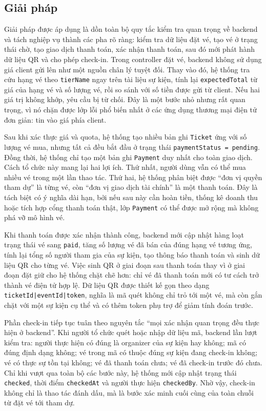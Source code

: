 \documentclass[../DoAn.tex]{subfiles}
\begin{document}
\subsection{Giải pháp}
Giải pháp được áp dụng là dồn toàn bộ quy tắc kiểm tra quan trọng về backend và tách nghiệp vụ thành các pha rõ ràng: kiểm tra dữ liệu đặt vé, tạo vé ở trạng thái chờ, tạo giao dịch thanh toán, xác nhận thanh toán, sau đó mới phát hành dữ liệu \gls{QR} và cho phép check-in. Trong controller đặt vé, backend không sử dụng giá client gửi lên như một nguồn chân lý tuyệt đối. Thay vào đó, hệ thống tra cứu hạng vé theo \texttt{tierName} ngay trên tài liệu sự kiện, tính lại \texttt{expectedTotal} từ giá của hạng vé và số lượng vé, rồi so sánh với số tiền được gửi từ client. Nếu hai giá trị không khớp, yêu cầu bị từ chối. Đây là một bước nhỏ nhưng rất quan trọng, vì nó chặn được lớp lỗi phổ biến nhất ở các ứng dụng thương mại điện tử đơn giản: tin vào giá phía client.

Sau khi xác thực giá và quota, hệ thống tạo nhiều bản ghi \texttt{Ticket} ứng với số lượng vé mua, nhưng tất cả đều bắt đầu ở trạng thái \texttt{paymentStatus = pending}. Đồng thời, hệ thống chỉ tạo một bản ghi \texttt{Payment} duy nhất cho toàn giao dịch. Cách tổ chức này mang lại hai lợi ích. Thứ nhất, người dùng vẫn có thể mua nhiều vé trong một lần thao tác. Thứ hai, hệ thống phân biệt được “đơn vị quyền tham dự” là từng vé, còn “đơn vị giao dịch tài chính” là một thanh toán. Đây là tách biệt có ý nghĩa dài hạn, bởi nếu sau này cần hoàn tiền, thống kê doanh thu hoặc tích hợp cổng thanh toán thật, lớp \texttt{Payment} có thể được mở rộng mà không phá vỡ mô hình vé.

Khi thanh toán được xác nhận thành công, backend mới cập nhật hàng loạt trạng thái vé sang \texttt{paid}, tăng số lượng vé đã bán của đúng hạng vé tương ứng, tính lại tổng số người tham gia của sự kiện, tạo thông báo thanh toán và sinh dữ liệu \gls{QR} cho từng vé. Việc sinh \gls{QR} ở giai đoạn sau thanh toán thay vì ở giai đoạn đặt giữ cho hệ thống chặt chẽ hơn: chỉ vé đã thanh toán mới có tư cách trở thành vé điện tử hợp lệ. Dữ liệu \gls{QR} được thiết kế gọn theo dạng \texttt{ticketId|eventId|token}, nghĩa là mã quét không chỉ trỏ tới một vé, mà còn gắn chặt với một sự kiện cụ thể và có thêm token phụ trợ để giảm tính đoán trước.

Phần check-in tiếp tục tuân theo nguyên tắc “mọi xác nhận quan trọng đều thực hiện ở backend”. Khi người tổ chức quét hoặc nhập dữ liệu mã, backend lần lượt kiểm tra: người thực hiện có đúng là organizer của sự kiện hay không; mã có đúng định dạng không; vé trong mã có thuộc đúng sự kiện đang check-in không; vé có thực sự tồn tại không; vé đã thanh toán chưa; vé đã check-in trước đó chưa. Chỉ khi vượt qua toàn bộ các bước này, hệ thống mới cập nhật trạng thái \texttt{checked}, thời điểm \texttt{checkedAt} và người thực hiện \texttt{checkedBy}. Nhờ vậy, check-in không chỉ là thao tác đánh dấu, mà là bước xác minh cuối cùng của toàn chuỗi từ đặt vé tới tham dự.
\end{document}
